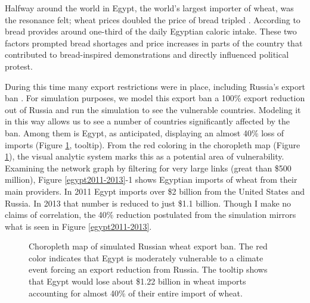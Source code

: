 Halfway around the world in Egypt, the world's largest importer of wheat, was the resonance felt; wheat prices doubled the price of bread tripled \citep{sternberg2012chinese}. According to \cite{croppenstedt2006food} bread provides around one-third of the daily Egyptian caloric intake. These two factors prompted bread shortages and price increases in parts of the country that contributed to bread-inspired demonstrations and directly influenced political protest. \par
During this time many export restrictions were in place, including Russia's export ban \citep{fellmann2014harvest}. For simulation purposes, we model this export ban a 100\% export reduction out of Russia and run the simulation to see the vulnerable countries. Modeling it in this way allows us to see a number of countries significantly affected by the ban. Among them is Egypt, as anticipated, displaying an almost 40\% loss of imports (Figure \ref{egypt2011}, tooltip). From the red coloring in the choropleth map (Figure \ref{egypt2011}), the visual analytic system marks this as a potential area of vulnerability. Examining the network graph by filtering for very large links (great than \$500 million), Figure \ref{egypt2011-2013}-1 shows Egyptian imports of wheat from their main providers. In 2011 Egypt imports over \$2 billion from the United States and Russia. In 2013 that number is reduced to just \$1.1 billion. Though I make no claims of correlation, the 40\% reduction postulated from the simulation mirrors what is seen in Figure \ref{egypt2011-2013}.\par
\begin{figure}[htb]
	\caption[CHOROPLETH MAP OF SIMULATED RUSSIAN WHEAT EXPORT BAN]{Choropleth map of simulated Russian wheat export ban. The red color indicates that Egypt is moderately vulnerable to a climate event forcing an export reduction from Russia. The tooltip shows that Egypt would lose about \$1.22 billion in wheat imports accounting for almost 40\% of their entire import of wheat.}
	\label{egypt2011}
\end{figure}
